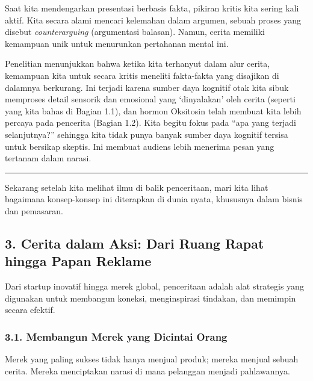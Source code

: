 \documentclass[
  letterpaper,
  DIV=11,
  numbers=noendperiod]{scrreprt}
\begin{document}
Saat kita mendengarkan presentasi berbasis fakta, pikiran kritis kita
sering kali aktif. Kita secara alami mencari kelemahan dalam argumen,
sebuah proses yang disebut \emph{counterarguing} (argumentasi balasan).
Namun, cerita memiliki kemampuan unik untuk menurunkan pertahanan mental
ini.

Penelitian menunjukkan bahwa ketika kita terhanyut dalam alur cerita,
kemampuan kita untuk secara kritis meneliti fakta-fakta yang disajikan
di dalamnya berkurang. Ini terjadi karena sumber daya kognitif otak kita
sibuk memproses detail sensorik dan emosional yang `dinyalakan' oleh
cerita (seperti yang kita bahas di Bagian 1.1), dan hormon Oksitosin
telah membuat kita lebih percaya pada pencerita (Bagian 1.2). Kita
begitu fokus pada ``apa yang terjadi selanjutnya?'' sehingga kita tidak
punya banyak sumber daya kognitif tersisa untuk bersikap skeptis. Ini
membuat audiens lebih menerima pesan yang tertanam dalam narasi.

\begin{center}\rule{0.5\linewidth}{0.5pt}\end{center}

Sekarang setelah kita melihat ilmu di balik penceritaan, mari kita lihat
bagaimana konsep-konsep ini diterapkan di dunia nyata, khususnya dalam
bisnis dan pemasaran.

\subsection{3. Cerita dalam Aksi: Dari Ruang Rapat hingga Papan
Reklame}\label{cerita-dalam-aksi-dari-ruang-rapat-hingga-papan-reklame}

Dari startup inovatif hingga merek global, penceritaan adalah alat
strategis yang digunakan untuk membangun koneksi, menginspirasi
tindakan, dan memimpin secara efektif.

\subsubsection{3.1. Membangun Merek yang Dicintai
Orang}\label{membangun-merek-yang-dicintai-orang}

Merek yang paling sukses tidak hanya menjual produk; mereka menjual
sebuah cerita. Mereka menciptakan narasi di mana pelanggan menjadi
pahlawannya.
\end{document}
